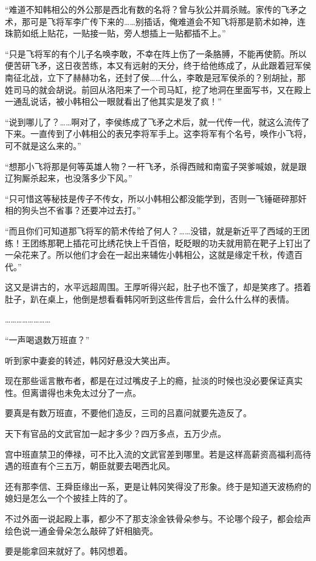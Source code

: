 “难道不知韩相公的外公那是西北有数的名将？曾与狄公并肩杀贼。家传的飞矛之术，那可是飞将军李广传下来的……别插话，俺难道会不知飞将那是箭术如神，连珠箭如纸上贴花，一贴接一贴，旁人想插上一贴都插不上。”

“只是飞将军的有个儿子名唤李敢，不幸在阵上伤了一条胳膊，不能再使箭。所以便苦研飞矛，这日夜苦练，本又有远射的天分，终于给他练成了，从此跟着冠军侯南征北战，立下了赫赫功名，还封了侯……什么，李敢是冠军侯杀的？别胡扯，那姓司马的就会胡说。前回从洛阳来了一个司马缸，挖了地洞在里面写书，又在殿上一通乱说话，被小韩相公一眼就看出了他其实是发了疯！”

“说到哪儿了？……啊对了，李侯练成了飞矛之术后，就一代传一代，就这么流传了下来。一直传到了小韩相公的表兄李将军手上。这李将军有个名号，唤作小飞将，可不就是这么来的。”

“想那小飞将那是何等英雄人物？一杆飞矛，杀得西贼和南蛮子哭爹喊娘，就是跟辽狗厮杀起来，也没落多少下风。”

“只可惜这等秘技是传子不传女，所以小韩相公都没能学到，否则一飞锤砸碎那奸相的狗头岂不省事？还要冲过去打。”

“而且你们可知道那飞将军的箭术传给了何人？……没错，就是新近平了西域的王团练！王团练那靶上插花可比绣花快上千百倍，眨眨眼的功夫就用箭在靶子上钉出了一朵花来了。所以他们才会在一起出来辅佐小韩相公，这就是缘定千秋，传遗百代。”

这又是讲古的，水平远超周围。王厚听得兴起，肚子也不饿了，却是笑疼了。捂着肚子，趴在桌上，他倒是想看看韩冈听到这些传言后，会什么什么样的表情。

……………………

“一声喝退数万班直？”

听到家中妻妾的转述，韩冈好悬没大笑出声。

现在那些谣言散布者，都是在过过嘴皮子上的瘾，扯淡的时候也没必要保证真实性。但离谱得也未免太过分了一点。

要真是有数万班直，不要他们造反，三司的吕嘉问就要先造反了。

天下有官品的文武官加一起才多少？四万多点，五万少点。

宫中班直禁卫的俸禄，可不比入流的文武官差到哪里。若是这样高薪资高福利高待遇的班直有个三五万，朝臣就要去喝西北风。

还有那李信、王舜臣缘出一系，更是让韩冈笑得没了形象。终于是知道天波杨府的媳妇是怎么一个个披挂上阵的了。

不过外面一说起殿上事，都少不了那支涂金铁骨朵参与。不论哪个段子，都会绘声绘色说一通金骨朵怎么敲碎了奸相脑壳。

要是能拿回来就好了。韩冈想着。

